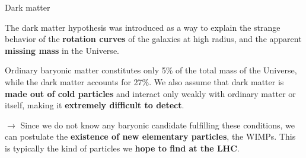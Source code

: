\documentclass[handout,8 pt]{beamer}
\begin{document}
\begin{frame}{Dark matter}
	
   \begin{minipage}[c]{.49\linewidth}
	\justifying
	The dark matter hypothesis was introduced as a way to explain the strange behavior of the \textbf{rotation curves} of the galaxies at high radius, and the apparent \textbf{missing mass} in the Universe. \vfill
   \end{minipage} \hfill
   \begin{minipage}[c]{.49\linewidth}
   \end{minipage} \hfill \vfill	
   
   \begin{minipage}[c]{.34\linewidth}
   \end{minipage} \hfill
   \begin{minipage}[c]{.64\linewidth}
   	\justifying
	Ordinary baryonic matter constitutes only  5\% of the total mass of the Universe, while the dark matter accounts for 27\%. \vfill \vspace{8pt}We also assume that dark matter is \textbf{made out of cold particles} and interact only weakly with ordinary matter or itself, making it \textbf{extremely difficult to detect}.
    \end{minipage} \hfill \vfill	
    
    \begin{block}{}
	\justifying
	\vspace{5pt}
   $\rightarrow$ Since we do not know any baryonic candidate fulfilling these conditions, we can postulate the \textbf{existence of new elementary particles}, the WIMPs. This is typically the kind of particles we \textbf{hope to find at the LHC}. \vspace{5pt}
    \end{block} \vfill
	
\end{frame}
\end{document}
